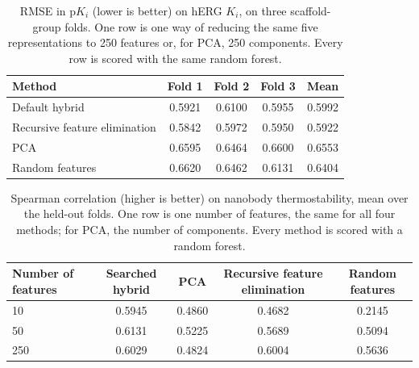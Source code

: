 \begin{table}[htbp]
\centering
\small
\begin{tabular}{@{}lcccc@{}}
\toprule
Method & Fold 1 & Fold 2 & Fold 3 & Mean \\
\midrule
Default hybrid & 0.5921 & 0.6100 & 0.5955 & 0.5992 \\
Recursive feature elimination & 0.5842 & 0.5972 & 0.5950 & 0.5922 \\
PCA & 0.6595 & 0.6464 & 0.6600 & 0.6553 \\
Random features & 0.6620 & 0.6462 & 0.6131 & 0.6404 \\
\bottomrule
\end{tabular}
\caption[The default hybrid against PCA, recursive feature elimination and random features on hERG $K_i$]{RMSE in p$K_i$ (lower is better) on hERG $K_i$, on three scaffold-group folds. One row is one way of reducing the same five representations to 250 features or, for PCA, 250 components. Every row is scored with the same random forest.}
\label{tab:prelim_reduction}
\end{table}

\begin{table}[htbp]
\centering
\small
\begin{tabular}{@{}lcccc@{}}
\toprule
Number of features & Searched hybrid & PCA & Recursive feature elimination & Random features \\
\midrule
10 & 0.5945 & 0.4860 & 0.4682 & 0.2145 \\
50 & 0.6131 & 0.5225 & 0.5689 & 0.5094 \\
250 & 0.6029 & 0.4824 & 0.6004 & 0.5636 \\
\bottomrule
\end{tabular}
\caption[The searched hybrid against PCA, recursive feature elimination and random features on nanobody thermostability]{Spearman correlation (higher is better) on nanobody thermostability, mean over the held-out folds. One row is one number of features, the same for all four methods; for PCA, the number of components. Every method is scored with a random forest.}
\label{tab:prelim_reduction_nanobody}
\end{table}

